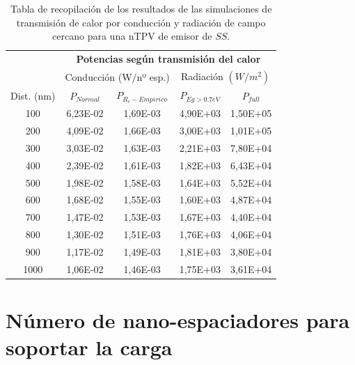 \begin{table}[h]
	\centering
		\begin{tabular}{|c||c|c||c|c|}
		\hline
\multirow{2}{*}{ }& \multicolumn{4}{c|}{\textbf{\large Potencias según transmisión del calor}}\\ \cline{2-5}
& \multicolumn{2}{c||}{Conducción (W/nº esp.)}& \multicolumn{2}{c|}{Radiación $(W/m^2)$}\\ \hline
Dist. (nm)&$P_{Normal}$&$P_{R_c-Empirico}$&$P_{Eg>0.7eV}$&$P_{full}$\\ \hline \hline
100&6,23E-02&1,69E-03&4,90E+03&1,50E+05\\ \hline 
200&4,09E-02&1,66E-03&3,00E+03&1,01E+05\\ \hline 
300&3,03E-02&1,63E-03&2,21E+03&7,80E+04\\ \hline 
400&2,39E-02&1,61E-03&1,82E+03&6,43E+04\\ \hline 
500&1,98E-02&1,58E-03&1,64E+03&5,52E+04\\ \hline 
600&1,68E-02&1,55E-03&1,60E+03&4,87E+04\\ \hline 
700&1,47E-02&1,53E-03&1,67E+03&4,40E+04\\ \hline 
800&1,30E-02&1,51E-03&1,76E+03&4,06E+04\\ \hline 
900&1,17E-02&1,49E-03&1,81E+03&3,80E+04\\ \hline 
1000&1,06E-02&1,46E-03&1,75E+03&3,61E+04\\ \hline 
		\end{tabular}
	\caption{Tabla de recopilación de los resultados de las simulaciones de transmisión de calor por conducción y radiación de campo cercano para una nTPV de emisor de $SS$.}
	\label{tab:SiCSiO2Ge}
\end{table}

\vfill \newpage
\section{Número de nano-espaciadores para soportar la carga}
